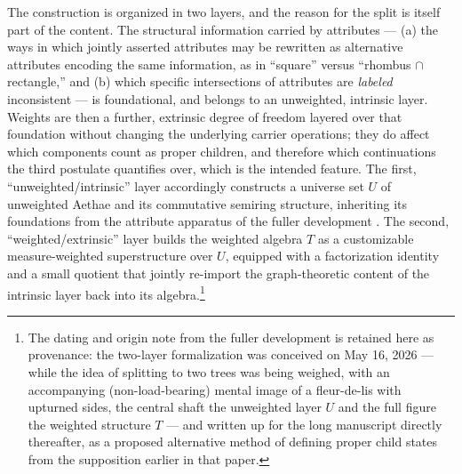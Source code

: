 The construction is organized in two layers, and the reason for the split is itself part of the content. The structural information carried by attributes --- (a) the ways in which jointly asserted attributes may be rewritten as alternative attributes encoding the same information, as in ``square'' versus ``rhombus $\cap$ rectangle,'' and (b) which specific intersections of attributes are \emph{labeled} inconsistent --- is foundational, and belongs to an unweighted, intrinsic layer. Weights are then a further, extrinsic degree of freedom layered over that foundation without changing the underlying carrier operations; they do affect which components count as proper children, and therefore which continuations the third postulate quantifies over, which is the intended feature. The first, ``unweighted/intrinsic'' layer accordingly constructs a universe set $U$ of unweighted Aethae and its commutative semiring structure, inheriting its foundations from the attribute apparatus of the fuller development \cite{Aethus}. The second, ``weighted/extrinsic'' layer builds the weighted algebra $T$ as a customizable measure-weighted superstructure over $U$, equipped with a factorization identity and a small quotient that jointly re-import the graph-theoretic content of the intrinsic layer back into its algebra.\footnote{The dating and origin note from the fuller development is retained here as provenance: the two-layer formalization was conceived on May 16, 2026 --- while the idea of splitting to two trees was being weighed, with an accompanying (non-load-bearing) mental image of a fleur-de-lis with upturned sides, the central shaft the unweighted layer $U$ and the full figure the weighted structure $T$ --- and written up for the long manuscript directly thereafter, as a proposed alternative method of defining proper child states from the supposition earlier in that paper.}

